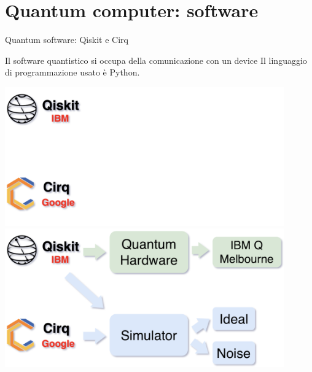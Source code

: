 \documentclass{beamer}
\renewcommand{\'}[0]{\`}
\begin{document}
\section{Quantum computer: software}

	
	\begin{frame}{Quantum software: Qiskit e Cirq}

	Il software quantistico si occupa della comunicazione con un device
	 Il linguaggio di programmazione usato è \alert{Python}.  \pause

	\vspace{0.5cm}




\centering
{} { \includegraphics[width=0.9\textwidth]{./image/Schema1.png}} 
 { \includegraphics[width=0.9\textwidth]{./image/Schema2.png}} 




		
		

\end{frame}
\end{document}
